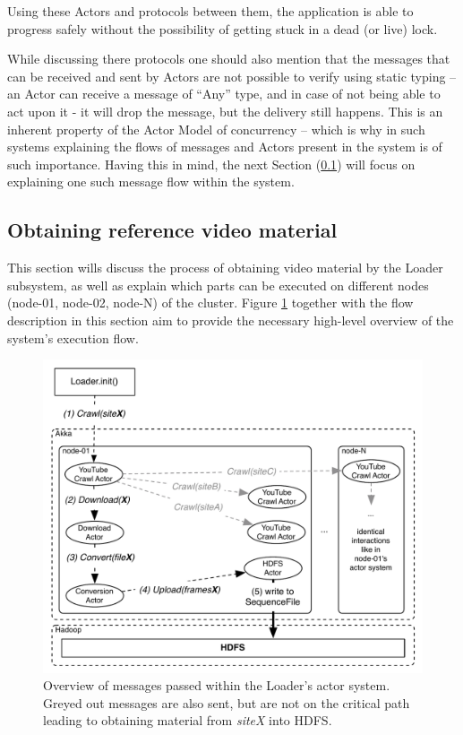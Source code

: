 Using these Actors and protocols between them, the application is able to progress safely without the possibility of getting stuck in a dead (or live) lock. 

While discussing there protocols one should also mention that the messages that can be received and sent by Actors are not possible to verify using static typing -- an Actor can receive a message of ``Any'' type, and in case of not being able to act upon it - it will drop the message, but the delivery still happens.
This is an inherent property of the Actor Model of concurrency -- which is why in such systems explaining the flows of messages and Actors present in the system is of such importance. Having this in mind, the next Section (\ref{sec:obtaining-reference-material}) will focus on explaining one such message flow within the system.

\subsection{Obtaining reference video material}
\label{sec:obtaining-reference-material}
This section wills discuss the process of obtaining video material by the Loader subsystem, as well as explain which parts can be executed on different nodes (node-01, node-02, node-N) of the cluster. Figure \ref{fig:high-level-loader} together with the flow description in this section aim to provide the necessary high-level overview of the system's execution flow.

\begin{figure}[ch!]
  \centering
  \includegraphics[scale=0.9]{img/loader-high-level.pdf}
  \caption{Overview of messages passed within the Loader's actor system. Greyed out messages are also sent, but are not on the critical path leading to obtaining material from \textit{siteX} into HDFS.}
  \label{fig:high-level-loader}
\end{figure}

